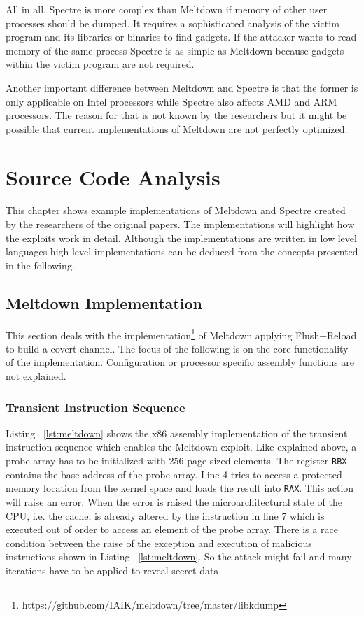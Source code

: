 \documentclass[a4paper,oneside,openright] {scrreprt}
\begin{document}
All in all, Spectre is more complex than Meltdown if memory of other user processes should be dumped.
It requires a sophisticated analysis of the victim program and its libraries or binaries to find gadgets.
If the attacker wants to read memory of the same process Spectre is as simple as Meltdown because gadgets within the victim program
are not required.

Another important difference between Meltdown and Spectre is that the former is only applicable on Intel processors while Spectre 
also affects AMD and ARM processors. The reason for that is not known by the researchers but it might be possible that current 
implementations of Meltdown are not perfectly optimized.

\chapter{Source Code Analysis}
\label{ch:sourceCodeAnalysis}

This chapter shows example implementations of Meltdown and Spectre created by the researchers of the original papers.
The implementations will highlight how the exploits work in detail. Although the implementations are written in low level languages 
high-level implementations can be deduced from the concepts presented in the following.

\section{Meltdown Implementation}
\label{ch:intro:motivation}

This section deals with the implementation\footnote{https://github.com/IAIK/meltdown/tree/master/libkdump} of Meltdown applying
Flush+Reload to build a covert channel. The focus of the following is on the core functionality of the implementation.
Configuration or processor specific assembly functions are not explained.

\subsection{Transient Instruction Sequence}
\label{ch:TransientInstructionSequence}

Listing ~\ref{lst:meltdown} shows the x86 assembly implementation of the transient instruction sequence
which enables the Meltdown exploit.
Like explained above, a probe array has to be initialized with 256 page sized elements.
The register \texttt{RBX} contains the base address of the probe array.
Line 4 tries to access a protected memory location from the kernel space and loads the result into \texttt{RAX}. 
This action will raise an error.
When the error is raised the microarchitectural state of the CPU, i.e. the cache, is already altered 
by the instruction in line 7 which is executed out of order to access an element of the probe array.
There is a race condition between the raise of the exception and execution of malicious instructions shown in Listing ~\ref{lst:meltdown}.
So the attack might fail and many iterations have to be applied to reveal secret data.
\end{document}
